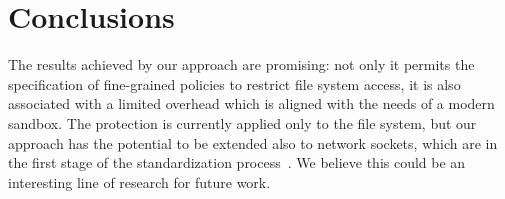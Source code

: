 \section{Conclusions}
\label{sect:wasm:conclusions}

The results achieved by our approach are promising: not only it
permits the specification of fine-grained policies to restrict file system
access, it is also associated with a limited overhead which is aligned
with the needs of a modern sandbox. The protection is currently
applied only to the file system, but our approach has the potential to
be extended also to network sockets, which are in the first stage of
the standardization process~\cite{wasi-sockets}. We believe this
could be an interesting line of research for future work.

